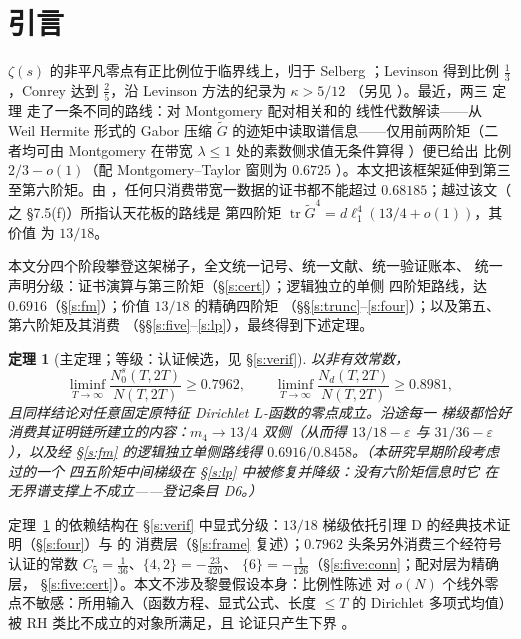 \documentclass[11pt]{article}
\numberwithin{equation}{section}
\newtheorem{theorem}{定理}[section]
\theoremstyle{definition}
\theoremstyle{remark}
\begin{document}
\section{引言}\label{s:intro}

$\zeta(s)$ 的非平凡零点有正比例位于临界线上，归于 Selberg
\cite{Sel42}；Levinson \cite{Lev74} 得到比例 $\tfrac13$，Conrey
\cite{Con89} 达到 $\tfrac25$，沿 Levinson 方法的纪录为
$\kappa>5/12$ \cite{PRZZ}（另见 \cite{BCY11,Fen12}）。最近，两三
定理 \cite{C26} 走了一条不同的路线：对 Montgomery 配对相关和的
线性代数解读——从 Weil Hermite 形式的 Gabor 压缩 $\widetilde G$
的迹矩中读取谱信息——仅用前两阶矩（二者均可由 Montgomery 在带宽
$\lambda\le1$ 处的素数侧求值无条件算得 \cite{Mon73,BGST}）便已给出
比例 $2/3-o(1)$（配 Montgomery--Taylor 窗则为 $0.6725$
\cite{Mon75}）。本文把该框架延伸到第三至第六阶矩。由
\cite[注记~1.1]{C26}，任何只消费带宽一数据的证书都不能超过
$0.68185$；越过该文（\cite{C26} 之 \S7.5(f)）所指认天花板的路线是
第四阶矩
$\operatorname{tr}\widetilde G^{4}=d\ell_1^{4}(13/4+o(1))$，其价值
为 $13/18$。

本文分四个阶段攀登这架梯子，全文统一记号、统一文献、统一验证账本、
统一声明分级：证书演算与第三阶矩（\S\ref{s:cert}）；逻辑独立的单侧
四阶矩路线，达 $0.6916$（\S\ref{s:fm}）；价值 $13/18$ 的精确四阶矩
（\S\S\ref{s:trunc}--\ref{s:four}）；以及第五、第六阶矩及其消费
（\S\S\ref{s:five}--\ref{s:lp}），最终得到下述定理。

\begin{theorem}[主定理；等级：认证候选，见
\S\ref{s:verif}]\label{t:main}
以非有效常数，
\[
\liminf_{T\to\infty}\frac{N_0^{s}(T,2T)}{N(T,2T)}\ge 0.7962,
\qquad
\liminf_{T\to\infty}\frac{N_d(T,2T)}{N(T,2T)}\ge 0.8981,
\]
且同样结论对任意固定原特征 Dirichlet $L$-函数的零点成立。沿途每一
梯级都恰好消费其证明链所建立的内容：$m_4\to13/4$ 双侧（从而得
$13/18-\varepsilon$ 与 $31/36-\varepsilon$），以及经 \S\ref{s:fm}
的逻辑独立单侧路线得 $0.6916/0.8458$。（本研究早期阶段考虑过的一个
四五阶矩中间梯级在 \S\ref{s:lp} 中被修复并降级：没有六阶矩信息时它
在无界谱支撑上不成立——登记条目 D6。）
\end{theorem}

定理~\ref{t:main} 的依赖结构在 \S\ref{s:verif} 中显式分级：$13/18$
梯级依托引理 D 的经典技术证明（\S\ref{s:four}）与 \cite{C26} 的
消费层（\S\ref{s:frame} 复述）；$0.7962$ 头条另外消费三个经符号
认证的常数 $C_5=\tfrac1{36}$、$\{4,2\}=-\tfrac{23}{420}$、
$\{6\}=-\tfrac1{126}$（\S\ref{s:five:conn}；配对层为精确层，
\S\ref{s:five:cert}）。本文不涉及黎曼假设本身：比例性陈述
对 $o(N)$ 个线外零点不敏感：所用输入（函数方程、显式公式、长度
$\le T$ 的 Dirichlet 多项式均值）被 RH 类比不成立的对象所满足，且
论证只产生下界 \cite[\S1.5]{C26}。
\end{document}
